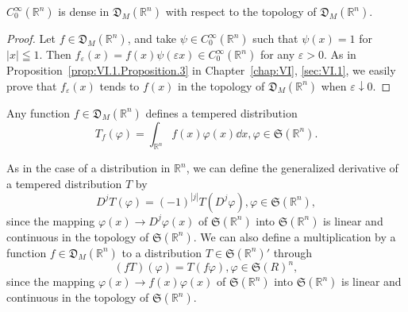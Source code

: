 \begin{proposition}\label{prop:VI.2.Proposition.2} $C_0^\infty (\mathbb{R}^{n})$ is dense in $\mathfrak{D}_M(\mathbb{R}^{n})$ with respect to the topology of $\mathfrak{D}_M(\mathbb{R}^{n})$. 
\end{proposition}

\begin{proof}
 Let $f \in \mathfrak{D}_M(\mathbb{R}^{n})$, and take $\psi \in C_0^\infty(\mathbb{R}^{n})$ such that $\psi(x) = 1$ for $|x| \leqq 1$. Then $f_{\varepsilon}(x) = f(x) \psi(\varepsilon x) \in C_0^\infty(\mathbb{R}^{n})$ for any $\varepsilon > 0$. As in Proposition~\ref{prop:VI.1.Proposition.3} in Chapter~\ref{chap:VI}, \ref{sec:VI.1}, we easily prove that $f_{\varepsilon}(x)$ tends to $f(x)$ in the topology of $\mathfrak{D}_M(\mathbb{R}^{n})$ when $\varepsilon \downarrow 0$. 
\end{proof}

\begin{proposition}\label{prop:VI.2.Proposition.3} Any function $f \in \mathfrak{D}_M(\mathbb{R}^{n})$ defines a tempered distribution 
\begin{equation}\label{eq:VI.2.7}
T _{f} (\varphi) = \int_ {\mathbb {R} ^{n}} f (x) \varphi (x) \dd x, \varphi \in \mathfrak {S} (\mathbb{R}^{n}).
\end{equation}
\end{proposition}

\begin{definition}\label{def:VI.2.Definition.3} As in the case of a distribution in $\mathbb{R}^{n}$, we can define the generalized derivative of a tempered distribution $T$ by 
\begin{equation}\label{eq:VI.2.8}
D ^{j} T (\varphi) = (- 1) ^{|j|} T (D ^{j} \varphi), \varphi \in \mathfrak {S} (\mathbb{R}^{n}),
\end{equation}
since the mapping $\varphi(x) \to D^{j}\varphi(x)$ of $\mathfrak{S}(\mathbb{R}^{n})$ into $\mathfrak{S}(\mathbb{R}^{n})$ is linear and continuous in the topology of $\mathfrak{S}(\mathbb{R}^{n})$. We can also define a multiplication by a function $f \in \mathfrak{D}_M(\mathbb{R}^{n})$ to a distribution $T \in \mathfrak{S}(\mathbb{R}^{n})'$ through 
\begin{equation}\label{eq:VI.2.9}
(f T) (\varphi) = T (f \varphi), \varphi \in \mathfrak {S} (R) ^{n},
\end{equation}
since the mapping $\varphi(x) \to f(x)\varphi(x)$ of $\mathfrak{S}(\mathbb{R}^{n})$ into $\mathfrak{S}(\mathbb{R}^{n})$ is linear and continuous in the topology of $\mathfrak{S}(\mathbb{R}^{n})$. 
\end{definition}

